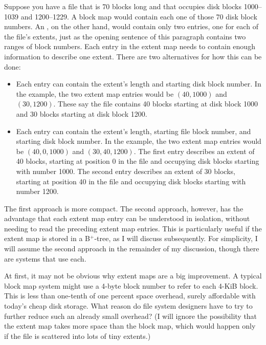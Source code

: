 Suppose you have a file that is 70 blocks long and that occupies
disk blocks 1000--1039 and 1200--1229.  A
block map would contain each one of those 70 disk block numbers.  An
, on the other hand, would contain only two
entries, one for each of the file's extents, just as the opening
sentence of this paragraph contains two
ranges of block numbers.  Each entry in the extent
map needs to contain enough information to describe one extent.  There
are two alternatives for how this can be done:
\begin{itemize}
\item
Each entry can contain the extent's length and starting disk block
number.  In the example, the two extent map entries would be $(40,
1000)$ and $(30, 1200)$.  These say the file contains 40 blocks
starting at disk block 1000 and 30 blocks starting at disk block
1200.
\item
Each entry can contain the extent's length, starting file block
number, and starting disk block number.  In the example, the two
extent map entries would be $(40, 0, 1000)$ and $(30, 40, 1200)$.  The
first entry describes an extent of 40 blocks, starting at position 0 in the
file and occupying disk blocks starting with number 1000.  The second entry
describes an extent of 30 blocks, starting
at position 40 in the file and occupying disk blocks starting with number 1200.
\end{itemize}
The first approach is more compact.  The second approach, however, has the
advantage that each extent map entry can be understood in isolation,
without needing to read the preceding extent map entries.  This is
particularly useful if the extent map is stored in a B${}^+$-tree, as I
will discuss subsequently. For simplicity, I will assume the second approach
in the remainder of my discussion, though there are systems that use
each.

At first, it may not be obvious why extent maps are a big improvement.
A typical block map system might use a 4-byte block number to refer
to each 4-KiB block.  This is less than one-tenth of one percent space
overhead, surely affordable with today's cheap disk storage.  What
reason do file system designers have to try to further reduce such an already small
overhead?  (I will ignore the possibility that the extent map takes
more space than the block map, which would happen only if the file is
scattered into lots of tiny extents.)

